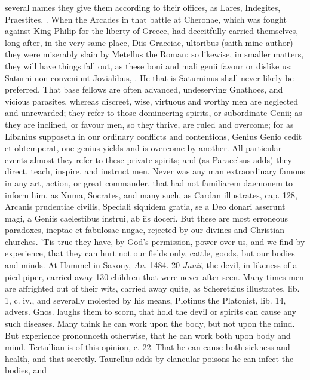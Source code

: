 {several names they give them according to their offices, as Lares,
Indegites, Praestites, \etc{}. When the Arcades in that battle at Cheronae,
which was fought against King Philip for the liberty of Greece, had
deceitfully carried themselves, long after, in the very same place,
Diis Graeciae, ultoribus (saith mine author) they were miserably slain
by Metellus the Roman: so likewise, in smaller matters, they will have
things fall out, as these boni and mali genii favour or dislike us:
Saturni non conveniunt Jovialibus, \etc{}. He that is Saturninus shall
never likely be preferred. That base fellows are often advanced,
undeserving Gnathoes, and vicious parasites, whereas discreet, wise,
virtuous and worthy men are neglected and unrewarded; they refer to
those domineering spirits, or subordinate Genii; as they are inclined,
or favour men, so they thrive, are ruled and overcome; for as
Libanius supposeth in our ordinary conflicts and contentions,
Genius Genio cedit et obtemperat, one genius yields and is overcome by
another. All particular events almost they refer to these private
spirits; and (as Paracelsus adds) they direct, teach, inspire, and
instruct men. Never was any man extraordinary famous in any art,
action, or great commander, that had not familiarem daemonem to inform
him, as Numa, Socrates, and many such, as Cardan illustrates, cap. 128,
Arcanis prudentiae civilis,  Speciali siquidem gratia, se a Deo
donari asserunt magi, a Geniis caelestibus instrui, ab iis doceri. But
these are most erroneous paradoxes, ineptae et fabulosae nugae,
rejected by our divines and Christian churches. 'Tis true they have, by
God's permission, power over us, and we find by experience, that they
can hurt not our fields only, cattle, goods, but our bodies and
minds. At Hammel in Saxony, \emph{An.} 1484. 20 \emph{Junii}, the devil, in
likeness of a pied piper, carried away 130 children that were never
after seen. Many times men are affrighted out of their wits,
carried away quite, as Scheretzius illustrates, lib. 1, c. iv., and
severally molested by his means, Plotinus the Platonist, lib. 14,
advers. Gnos. laughs them to scorn, that hold the devil or spirits can
cause any such diseases. Many think he can work upon the body, but not
upon the mind. But experience pronounceth otherwise, that he can work
both upon body and mind. Tertullian is of this opinion, c. 22.
That he can cause both sickness and health, and that secretly.
Taurellus adds by clancular poisons he can infect the bodies, and
}
